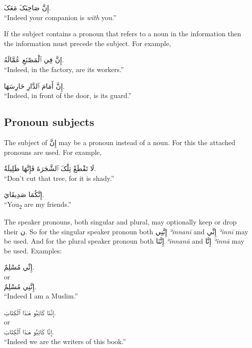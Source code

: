\documentclass[
  10pt,
]{book}
\begin{document}
\foreignlanguage{arabic}{إِنَّ صَاحِبَکَ مَعَکَ.}\\
\enquote{Indeed your companion is \emph{with} you.}

If the subject contains a pronoun that refers to a noun in the information then the information must precede the subject. For example,

\foreignlanguage{arabic}{إِنَّ فِي ٱلْمَصْنَعِ عُمَّالَهُ.}\\
\enquote{Indeed, in the factory, are its workers.}

\foreignlanguage{arabic}{إِنَّ أَمَامَ ٱلدَّارِ حَارِسَهَا.}\\
\enquote{Indeed, in front of the door, is its guard.}

\subsection{Pronoun subjects}\label{pronoun-subjects}

The subject of \foreignlanguage{arabic}{إِنَّ} may be a pronoun instead of a noun. For this the attached pronouns are used. For example,

\foreignlanguage{arabic}{لَا تَقْطَعْ تِلْکَ ٱلشَّجَرَةَ فَإِنَّهَا ظَلِيلَةٌ.}\\
\enquote{Don't cut that tree, for it is shady.}

\foreignlanguage{arabic}{إِنَّکُمَا صَدِيقَايَ.}\\
\enquote{You\textsubscript{2} are my friends.}

The speaker pronouns, both singular and plural, may optionally keep or drop their \foreignlanguage{arabic}{ن}.
So for the singular speaker pronoun both \foreignlanguage{arabic}{إِنَّنِي} \emph{ʾinnanī} and \foreignlanguage{arabic}{إِنِّي} \emph{ʾinnī} may be used.
And for the plural speaker pronoun both \foreignlanguage{arabic}{إِنَّنَا} \emph{ʾinnanā} and \foreignlanguage{arabic}{إِنَّا} \emph{ʾinnā} may be used.
Examples:

\foreignlanguage{arabic}{إِنِّي مُسْلِمٌ.}\\
or\\
\foreignlanguage{arabic}{إِنَّنِي مُسْلِمٌ.}\\
\enquote{Indeed I am a Muslim.}

\foreignlanguage{arabic}{إِنَّنَا کَاتِبُو هَـٰذَا ٱلْکِتَابَ.}\\
or\\
\foreignlanguage{arabic}{إِنَّا کَاتِبُو هَـٰذَا ٱلْکِتَابَ.}\\
\enquote{Indeed we are the writers of this book.}
\end{document}
